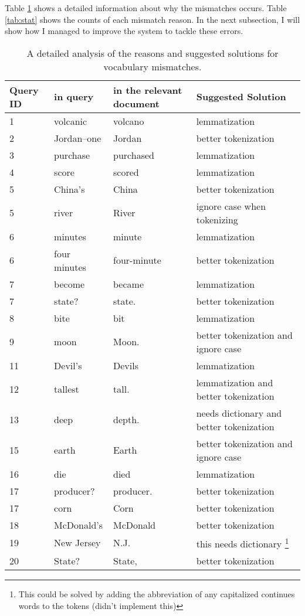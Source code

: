 \documentclass{article}
\begin{document}
Table \ref{tab:errors} shows a detailed information about why the mismatches occurs. Table \ref{tab:stat} shows the counts of each mismatch reason. In the next subsection, I will show how I managed to improve the system to tackle these errors.
\begin{table}
\centering
\begin{tabular}{|l | l | l | l| }
  \hline
  \textbf{Query ID} & \textbf{in query} & \textbf{in the relevant document} & \textbf{Suggested Solution} \\
  \hline
1 & volcanic & volcano & lemmatization\\
2 & Jordan--one & Jordan & better tokenization\\
3 &   purchase & purchased & lemmatization \\
4 &   score & scored & lemmatization \\
5 & China's & China & better tokenization\\
5 & river & River & ignore case when tokenizing\\
6 &  minutes & minute & lemmatization \\
6 & four minutes & four-minute & better tokenization\\
7 &   become & became & lemmatization \\
7 &   state? & state. & better tokenization \\
8 & bite & bit & lemmatization \\
9 & moon & Moon. & better tokenization and ignore case\\
11 & Devil's & Devils & lemmatization\\
12 & tallest & tall. & lemmatization and better tokenization\\
13 & deep & depth. & needs dictionary and better tokenization\\
15 & earth & Earth & better tokenization and ignore case\\
16 & die & died & lemmatization\\
17 & producer? & producer. & better tokenization\\
17 & corn & Corn & better tokenization\\
18 & McDonald's & McDonald & better tokenization\\
19 & New Jersey & N.J. & this needs dictionary \footnote{This could be solved by adding the abbreviation of any capitalized continues words to the tokens (didn't implement this)}\\
20 & State? & State, & better tokenization \\
\hline
\end{tabular}
\caption{A detailed analysis of the reasons and suggested solutions for vocabulary mismatches.}
\label{tab:errors}
\end{table}
\end{document}
